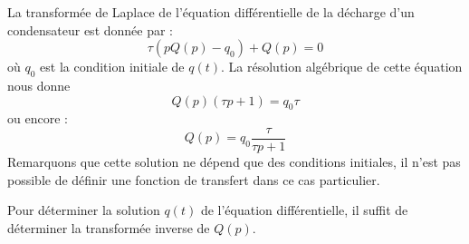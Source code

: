 La transformée de Laplace de l'équation différentielle de la décharge d'un
condensateur est donnée par :
\[
    \tau(pQ(p)-q_0)+Q(p)=0
\]
où $q_0$ est la condition initiale de $q(t)$.
La résolution algébrique de cette équation nous donne 
\[
    Q(p)(\tau p+1)=q_0\tau
\]
ou encore :
\[
    Q(p)=q_0\dfrac{\tau}{\tau p+1}
\]
Remarquons que cette solution ne dépend que des conditions initiales, il n'est 
pas possible de définir une fonction de transfert dans ce cas particulier.

Pour déterminer la solution $q(t)$ de l'équation différentielle, il suffit de 
déterminer la transformée inverse de $Q(p)$.

